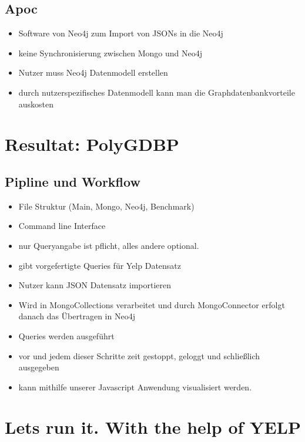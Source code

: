\documentclass[12pt,usenames,dvipsnames]{beamer}
\begin{document}
\subsection{Apoc}
\begin{frame}

\begin{itemize}[<+- | alert@+>]
\item Software von Neo4j zum Import von JSONs in die Neo4j
\item keine Synchronisierung zwischen Mongo und Neo4j
\item Nutzer muss Neo4j Datenmodell erstellen
\item durch nutzerspezifisches Datenmodell kann man die Graphdatenbankvorteile auskosten
\end{itemize}

\end{frame}
\section{Resultat: PolyGDBP}
\subsection{Pipline und Workflow}
\begin{frame}
\begin{itemize}[<+- | alert@+>]
\item File Struktur (Main, Mongo, Neo4j, Benchmark)
\item Command line Interface
\item nur Queryangabe ist pflicht, alles andere optional.
\item gibt vorgefertigte Queries für Yelp Datensatz
\item Nutzer kann JSON Datensatz importieren
\item Wird in MongoCollections verarbeitet und durch MongoConnector erfolgt danach das Übertragen in Neo4j
\item Queries werden ausgeführt
\item vor und jedem dieser Schritte zeit gestoppt, geloggt und schließlich ausgegeben
\item kann mithilfe unserer Javascript Anwendung visualisiert werden.
\end{itemize}
\end{frame}
\section{Lets run it. With the help of YELP}
\end{document}
